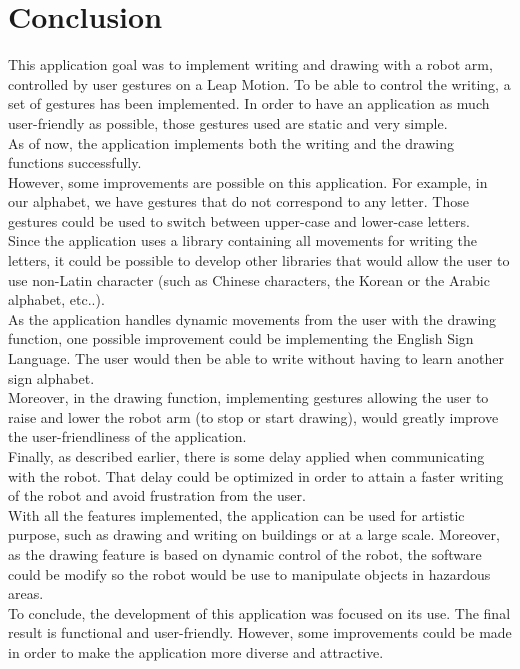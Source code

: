 \section{Conclusion}
This application goal was to implement writing and drawing with a robot arm, controlled by user gestures on a Leap Motion. To be able to control the writing, a set of gestures has been implemented. In order to have an application as much user-friendly as possible, those gestures used are static and very simple.\\
As of now, the application implements both the writing and the drawing functions successfully.\\

However, some improvements are possible on this application. For example, in our alphabet, we have gestures that do not correspond to any letter. Those gestures could be used to switch between upper-case and lower-case letters.\\
Since the application uses a library containing all movements for writing the letters, it could be possible to develop other libraries that would allow the user to use non-Latin character (such as Chinese characters, the Korean or the Arabic alphabet, etc..).\\

As the application handles dynamic movements from the user with the drawing function, one possible improvement could be implementing the English Sign Language. The user would then be able to write without having to learn another sign alphabet.\\
Moreover, in the drawing function, implementing gestures allowing the user to raise and lower the robot arm (to stop or start drawing), would greatly improve the user-friendliness of the application.\\

Finally, as described earlier, there is some delay applied when communicating with the robot. That delay could be optimized in order to attain a faster writing of the robot and avoid frustration from the user.\\

With all the features implemented, the application can be used for artistic purpose, such as drawing and writing on buildings or at a large scale. Moreover, as the drawing feature is based on dynamic control of the robot, the software could be modify so the robot would be use to manipulate objects in hazardous areas.\\

To conclude, the development of this application was focused on its use. The final result is functional and user-friendly. However, some improvements could be made in order to make the application more diverse and attractive.
